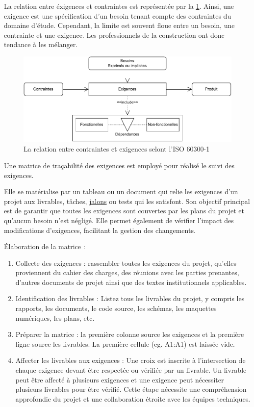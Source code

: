 \documentclass[a4paper,12pt]{article}
\begin{document}
La relation entre éxigences et contraintes est représentée par la \ref{fig:orgf98e334}. Ainsi, une exigence est une spécification d'un besoin tenant compte des contraintes du domaine d'étude. Cependant, la limite est souvent floue entre un besoin, une contrainte et une exigence. Les professionnels de la construction ont donc tendance à les mélanger.

\begin{figure}[htbp]
\centering
\includegraphics[width=.9\linewidth]{./svg/relation-contraintes-exigences.pdf}
\caption{\label{fig:orgf98e334}La relation entre contraintes et exigences selont l'ISO 60300-1\autocite{GestionSureteFonctionnement2014}}
\end{figure}

Une matrice de traçabilité des exigences est employé pour réalisé le suivi des exigences.

Elle se matérialise par un tableau ou un document qui relie les exigences d'un projet aux livrables, tâches, \protect\hyperlink{gls-2}{\label{gls-2-use-1}jalons} ou tests qui les satisfont. Son objectif principal est de garantir que toutes les exigences sont couvertes par les plans du projet et qu'aucun besoin n'est négligé. Elle permet également de vérifier l'impact des modifications d'exigences, facilitant la gestion des changements.

Élaboration de la matrice :
\begin{enumerate}
\item Collecte des exigences : rassembler toutes les exigences du projet, qu'elles proviennent du cahier des charges, des réunions avec les parties prenantes, d'autres documents de projet ainsi que des textes institutionnels applicables.
\item Identification des livrables : Listez tous les livrables du projet, y compris les rapports, les documents, le code source, les schémas, les maquettes numériques, les plans, etc.
\item Préparer la matrice : la première colonne source les exigences et la première ligne source les livrables. La première cellule (eg. A1:A1) est laissée vide.
\item Affecter les livrables aux exigences : Une croix est inscrite à l'intersection de chaque exigence devant être respectée ou vérifiée par un livrable. Un livrable peut être affecté à plusieurs exigences et une exigence peut nécessiter plusieurs livrables pour être vérifié. Cette étape nécessite une compréhension approfondie du projet et une collaboration étroite avec les équipes techniques.
\end{enumerate}
\end{document}
